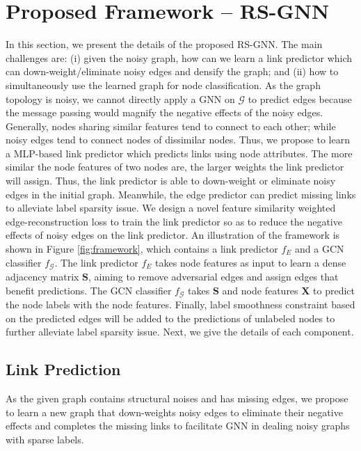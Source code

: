 \section{Proposed Framework -- RS-GNN}
\label{sec:methodology}
In this section, we present the details of the proposed RS-GNN. 
The main challenges are: (i) given the noisy graph, how can we learn a link predictor which can down-weight/eliminate noisy edges and densify the graph; and (ii) how to simultaneously use the  learned graph for node classification. As the graph topology is noisy, we cannot directly apply a GNN on $\mathcal{G}$ to predict edges because the message passing would magnify the negative effects of the noisy edges. Generally, nodes sharing similar features tend to connect to each other; while noisy edges tend to connect nodes of dissimilar nodes. Thus, we propose 
to learn a MLP-based link predictor which predicts links using node attributes. The more similar the node features of two nodes are, the larger weights the link predictor will assign. Thus, the link predictor is able to down-weight or eliminate noisy edges in the initial graph. Meanwhile, the edge predictor can predict missing links to alleviate label sparsity issue. We design a novel feature similarity weighted edge-reconstruction loss to train the link predictor so as to reduce the negative effects of noisy edges on the link predictor.
An illustration of the framework is shown in Figure \ref{fig:framework}, which contains a link predictor $f_E$ and a GCN classifier $f_{\mathcal{G}}$. The link predictor $f_E$ takes node features as input to learn a dense adjacency matrix $\mathbf{S}$, aiming to remove adversarial edges and assign edges that benefit predictions. The GCN classifier $f_{\mathcal{G}}$ takes $\mathbf{S}$ and node features $\mathbf{X}$ to predict the node labels with the node features. Finally, label smoothness constraint based on the predicted edges will be added to the predictions of unlabeled nodes to further alleviate label sparsity issue. Next, we give the details of each component.


\subsection{Link Prediction}
As the given graph contains structural noises and has missing edges, we propose to learn a new graph that down-weights noisy edges to eliminate their negative effects and completes the missing links to facilitate  GNN in dealing noisy graphs with sparse labels. 

